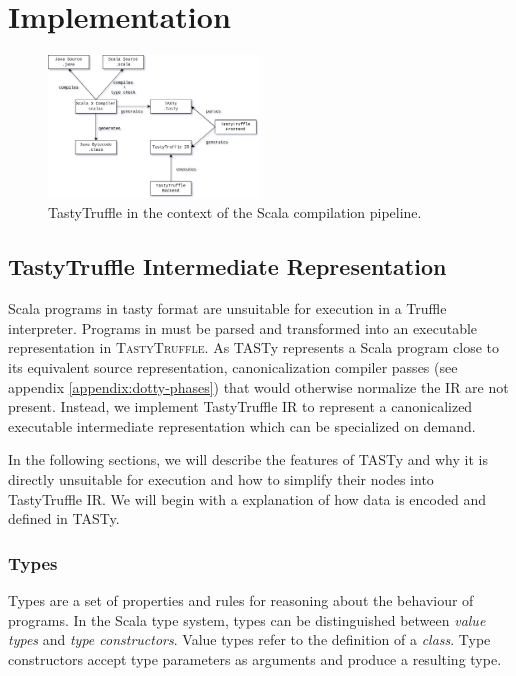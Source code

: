 \chapter{Implementation}

\begin{figure}[H]
	\centering
	\includegraphics[width=0.5\textwidth]{figures/tastytruffle-pipeline.png}
	\caption{TastyTruffle in the context of the Scala compilation pipeline.}
\end{figure}

\section{TastyTruffle Intermediate Representation}

Scala programs in \acrshort{tasty} format are unsuitable for execution in a Truffle interpreter. 
Programs in must be parsed and transformed into an executable representation in \textsc{TastyTruffle}. 
As TASTy represents a Scala program close to its equivalent source representation, canonicalization compiler passes (see appendix \ref{appendix:dotty-phases}) that would otherwise normalize the IR are not present. 
Instead, we implement TastyTruffle IR to represent a canonicalized executable intermediate representation which can be specialized on demand. 

In the following sections, we will describe the features of TASTy and why it is directly unsuitable for execution and how to simplify their nodes into TastyTruffle IR.
We will begin with a explanation of how data is encoded and defined in TASTy.

\subsection*{Types}

Types are a set of properties and rules for reasoning about the behaviour of programs. 
In the Scala type system, types can be distinguished between \textit{value types} and \textit{type constructors}. 
Value types refer to the definition of a  \textit{class}. 
Type constructors accept type parameters as arguments and produce a resulting type.

